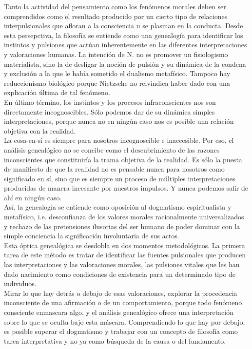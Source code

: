 \documentclass[a4paper, 10pt, twocolumn, spanish]{article}
\begin{document}
Tanto la actividad del pensamiento como los fenómenos morales deben
ser comprendidos como el resultado producido por un cierto tipo de
relaciones interpulsionales que afloran a la consciencia u se plasman
en la conducta. Desde esta persepctiva, la filosofía se entiende como
una genealogía para identificar los instintos y pulsiones que actúan
inherentemente en las diferentes interpretaciones y valoraciones
humanas. La intención de N. no es promover un fisiologismo
materialista, sino la de desligar la noción de pulsión y su dinámica
de la condena y exclusión a la que le había sometido el dualismo
metafísico.  Tampoco hay reduccionismo biológico porque Nietzsche no
reivindica haber dado con una explicación última de tal fenómeno.\\[0pt]
En último término, los instintos y los procesos infraconscientes nos
son directamente incognoscibles. Sólo podemos dar de su dinámica
simples interpretaciones, porque nunca no en ningún caso nos es
posible una relación objetiva con la realidad.\\[0pt]
La cosa-en-sí es siempre para nosotros incognoscible e
inaccesible. Por eso, el análisis genealógico no se concibe como el
descubrimiento de las razones inconscientes que constituiría la trama
objetiva de la realidad. Es sólo la puesta de manifiesto de que la
realidad no es pensable nunca para nosotros como significado en sí,
sino que es siempre un proceso de múltiples interpretaciones
producidas de manera incesante por nuestros impulsos. Y nunca podemos
salir de ahí en ningún caso.\\[0pt]

Así, la genealogía se entiende como oposición al dogmatismo
espiritualista y metafísico, i.e. desconfianza de los valores morales
racionalmente universalizados y rechazo de las pretensiones ilusorias
del ser humano de poder dominar con la simple conciencia la
significación involuntaria de sus actos.\\[0pt]
Esta óptica genealógica se desdobla en dos momentos metodológicos. La
primera tarea de este método es tratar de identificar las fuentes
pulsionales que producen las interpretaciones y las valoraciones
morales, las pulsiones vitales que les han dado nacimiento como
condiciones de existencia para un determinado tipo de individuos.\\[0pt]

Mirar lo que hay detrás o debajo de esas valoraciones, explorar la
procedencia inconsciente de una afirmación o de un comportamiento,
porque todo fenómeno consciente enmascara algo, y el análisis
genealógico ofrece una interpretación sobre lo que se oculta bajo esta
máscara. Comprendiendo lo que hay por debajo, es posible superar el
dogmatismo y trabajar con un concepto de filosofía como tarea
interpretativa y no ya como búsqueda de la causa o del fundamento.\\[0pt]
\end{document}
